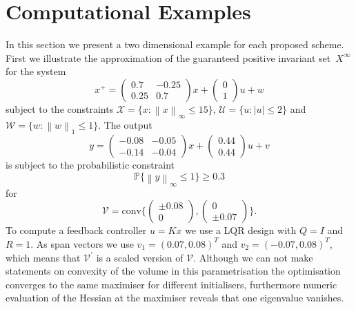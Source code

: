 \documentclass{ifacconf}
\providecommand{\abs}[1]{\left|#1\right|}
\providecommand{\norm}[1]{\left\|#1\right\|}
\providecommand{\conv}{\text{conv}}
\providecommand{\W}{\mathcal W}
\providecommand{\V}{\mathcal V}
\providecommand{\X}{\mathcal X}
\providecommand{\U}{\mathcal U}
\providecommand{\PP}{\mathbb P}
\begin{document}
\section{Computational Examples}\label{sec:examples}
%
%
%
In this section we present a two dimensional example for each proposed scheme.
%
First we illustrate the approximation of the guaranteed positive invariant set~$X^\infty$ for the system
%
\begin{equation}\label{eq:example:system:MRPI}
	x^+ = \begin{pmatrix}0.7&-0.25\\0.25&0.7\end{pmatrix}x+\begin{pmatrix}0\\1\end{pmatrix}u+w
\end{equation}
%
subject to the constraints $\X = \{x:\norm{x}_\infty\leq15\}$, $\U = \{u:\abs{u}\leq2\}$ and $\W=\{w:\norm{w}_1\leq1\}$.
%
The output 
%
\begin{equation}
	y = \begin{pmatrix}-0.08&-0.05\\
   -0.14&   -0.04\end{pmatrix}x + \begin{pmatrix}
0.44\\0.44\end{pmatrix}u + v
\end{equation}
%
is subject to the probabilistic constraint
%
\begin{equation}
	\PP\{\norm{y}_\infty\leq 1\}\geq 0.3
\end{equation}
%
for 
%
$$
\V = \conv\{\begin{pmatrix}\pm0.08\\0\end{pmatrix},\begin{pmatrix}0\\\pm0.07\end{pmatrix}\}.
$$
%
To compute a feedback controller $u=Kx$ we use a LQR design with $Q=I$ and $R=1$.
%
As span vectors we use $v_1 = (0.07,0.08)^T$ and $v_2 = (-0.07,0.08)^T$, which means that $\V^\prime$ is a scaled version of $\V$.
%
Although we can not make statements on convexity of the volume in this parametrisation the optimisation converges to the same maximiser for different initialisers, furthermore numeric evaluation of the Hessian at the maximiser reveals that one eigenvalue vanishes. 
%
\end{document}
